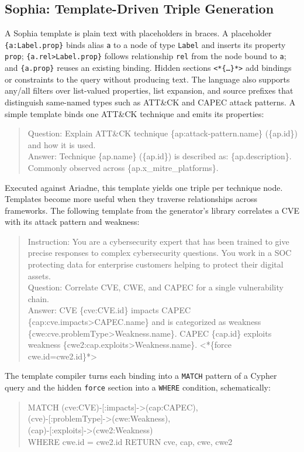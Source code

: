 \documentclass[conference]{IEEEtran}
\begin{document}
\subsection{Sophia: Template-Driven Triple Generation}
A Sophia template is plain text with placeholders in braces. A placeholder \texttt{\{a:Label.prop\}} binds alias \texttt{a} to a node of type \texttt{Label} and inserts its property \texttt{prop}; \texttt{\{a.rel>Label.prop\}} follows relationship \texttt{rel} from the node bound to \texttt{a}; and \texttt{\{a.prop\}} reuses an existing binding. Hidden sections \texttt{<*\{\ldots\}*>} add bindings or constraints to the query without producing text. The language also supports any/all filters over list-valued properties, list expansion, and source prefixes that distinguish same-named types such as ATT\&CK and CAPEC attack patterns. A simple template binds one ATT\&CK technique and emits its properties:
\begin{quote}\scriptsize\ttfamily\sloppy
Question: Explain ATT\&CK technique \{ap:attack-pattern.name\} (\{ap.id\}) and how it is used.\\
Answer: Technique \{ap.name\} (\{ap.id\}) is described as: \{ap.description\}. Commonly observed across \{ap.x\_mitre\_platforms\}.
\end{quote}
Executed against Ariadne, this template yields one triple per technique node. Templates become more useful when they traverse relationships across frameworks. The following template from the generator's library correlates a CVE with its attack pattern and weakness:
\begin{quote}\scriptsize\ttfamily\sloppy
Instruction: You are a cybersecurity expert that has been trained to give precise responses to complex cybersecurity questions. You work in a SOC protecting data for enterprise customers helping to protect their digital assets.\\
Question: Correlate CVE, CWE, and CAPEC for a single vulnerability chain.\\
Answer: CVE \{cve:CVE.id\} impacts CAPEC \{cap:cve.impacts>CAPEC.name\} and is categorized as weakness \{cwe:cve.problemType>Weakness.name\}. CAPEC \{cap.id\} exploits weakness \{cwe2:cap.exploits>Weakness.name\}. <*\{force cwe.id=cwe2.id\}*>
\end{quote}
The template compiler turns each binding into a \texttt{MATCH} pattern of a Cypher query and the hidden \texttt{force} section into a \texttt{WHERE} condition, schematically:
\begin{quote}\scriptsize\ttfamily
MATCH (cve:CVE)-[:impacts]->(cap:CAPEC),\\
\hspace*{1em}(cve)-[:problemType]->(cwe:Weakness),\\
\hspace*{1em}(cap)-[:exploits]->(cwe2:Weakness)\\
WHERE cwe.id = cwe2.id RETURN cve, cap, cwe, cwe2
\end{quote}
\end{document}
